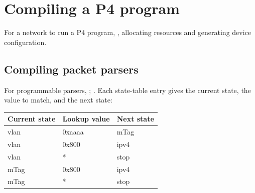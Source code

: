 \section{Compiling a P4 program}
For a network to run a P4 program, , allocating resources and generating device configuration.

\subsection{Compiling packet parsers}
For programmable parsers, ; . Each state-table entry gives the current state, the value to match, and the next state:
\begin{center}
\begin{tabular}{@{}lll@{}}
\toprule
\textbf{Current state} & \textbf{Lookup value} & \textbf{Next state} \\
\midrule
vlan & 0xaaaa & mTag \\
vlan & 0x800 & ipv4 \\
vlan & * & stop \\
mTag & 0x800 & ipv4 \\
mTag & * & stop \\
\bottomrule
\end{tabular}
\end{center}

